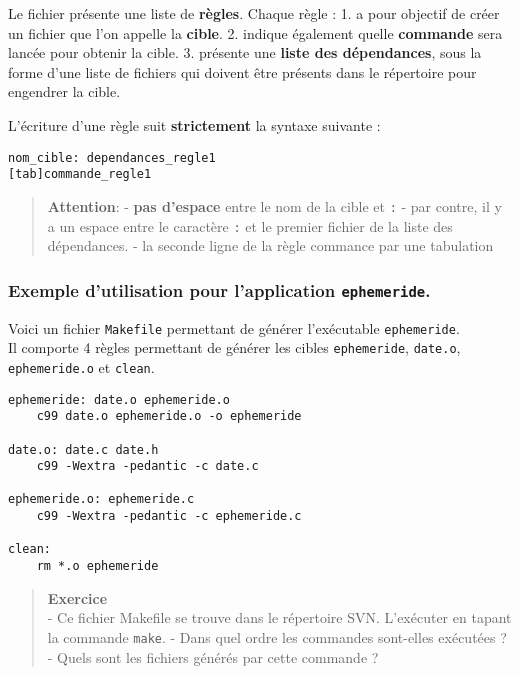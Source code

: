 \documentclass[11pt]{article}
\begin{document}
Le fichier présente une liste de \textbf{règles}. Chaque règle : 1. a
pour objectif de créer un fichier que l'on appelle la \textbf{cible}. 2.
indique également quelle \textbf{commande} sera lancée pour obtenir la
cible. 3. présente une \textbf{liste des dépendances}, sous la forme
d'une liste de fichiers qui doivent être présents dans le répertoire
pour engendrer la cible.

L'écriture d'une règle suit \textbf{strictement} la syntaxe suivante :

\begin{verbatim}
nom_cible: dependances_regle1
[tab]commande_regle1
\end{verbatim}

\begin{quote}
\textbf{Attention}: - \textbf{pas d'espace} entre le nom de la cible et
\texttt{:} - par contre, il y a un espace entre le caractère \texttt{:}
et le premier fichier de la liste des dépendances. - la seconde ligne de
la règle commance par une tabulation
\end{quote}

    \subsubsection{\texorpdfstring{Exemple d'utilisation pour l'application
\texttt{ephemeride}.}{Exemple d'utilisation pour l'application ephemeride.}}\label{exemple-dutilisation-pour-lapplication-ephemeride.}

Voici un fichier \texttt{Makefile} permettant de générer l'exécutable
\texttt{ephemeride}.\\
Il comporte 4 règles permettant de générer les cibles
\texttt{ephemeride}, \texttt{date.o}, \texttt{ephemeride.o} et
\texttt{clean}.

\begin{verbatim}
ephemeride: date.o ephemeride.o
    c99 date.o ephemeride.o -o ephemeride

date.o: date.c date.h
    c99 -Wextra -pedantic -c date.c

ephemeride.o: ephemeride.c
    c99 -Wextra -pedantic -c ephemeride.c
    
clean:
    rm *.o ephemeride
\end{verbatim}

\begin{quote}
\textbf{Exercice}\\
- Ce fichier Makefile se trouve dans le répertoire SVN. L'exécuter en
tapant la commande \texttt{make}. - Dans quel ordre les commandes
sont-elles exécutées ? - Quels sont les fichiers générés par cette
commande ?
\end{quote}
\end{document}
